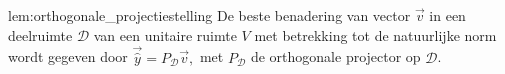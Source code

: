 \begin{lem}{lem:orthogonale_projectiestelling}
    De beste benadering van vector $\vec{v}$ in een deelruimte $\mathcal{D}$ van een unitaire ruimte $V$ met betrekking tot de natuurlijke norm wordt gegeven door $ \vec{\hat{y}} = P_{\mathcal{D}}\vec{v},$
    met $P_{\mathcal{D}}$ de orthogonale projector op $\mathcal{D}$. 
\end{lem}